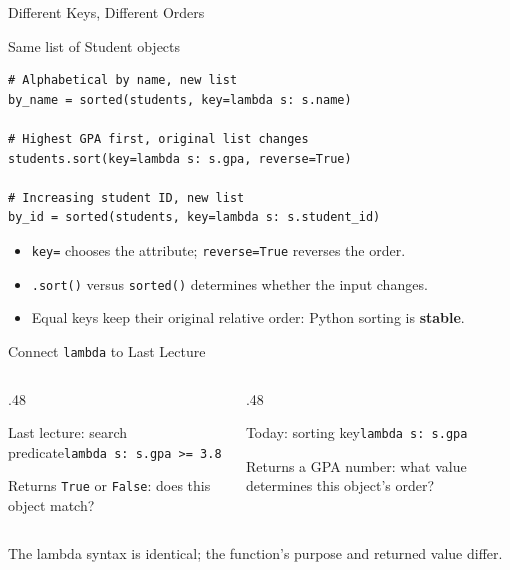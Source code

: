 \documentclass[aspectratio=169,10pt]{beamer}
\begin{document}
\begin{frame}[fragile]{Different Keys, Different Orders}
\small
\begin{block}{Same list of Student objects}
\footnotesize
\begin{verbatim}
# Alphabetical by name, new list
by_name = sorted(students, key=lambda s: s.name)

# Highest GPA first, original list changes
students.sort(key=lambda s: s.gpa, reverse=True)

# Increasing student ID, new list
by_id = sorted(students, key=lambda s: s.student_id)
\end{verbatim}
\end{block}
\begin{itemize}
 \item \texttt{key=} chooses the attribute; \texttt{reverse=True} reverses the order.
 \item \texttt{.sort()} versus \texttt{sorted()} determines whether the input changes.
 \item Equal keys keep their original relative order: Python sorting is \textbf{stable}.
\end{itemize}
\end{frame}

\begin{frame}{Connect \texttt{lambda} to Last Lecture}
\small
\begin{columns}[T,onlytextwidth]
\begin{column}{.48\textwidth}
\begin{block}{Last lecture: search predicate}\texttt{lambda s: s.gpa >= 3.8}\end{block}
Returns \texttt{True} or \texttt{False}: does this object match?
\end{column}
\begin{column}{.48\textwidth}
\begin{block}{Today: sorting key}\texttt{lambda s: s.gpa}\end{block}
Returns a GPA number: what value determines this object's order?
\end{column}
\end{columns}
\begin{keyidea}The lambda syntax is identical; the function's purpose and returned value differ.\end{keyidea}
\end{frame}
\end{document}
